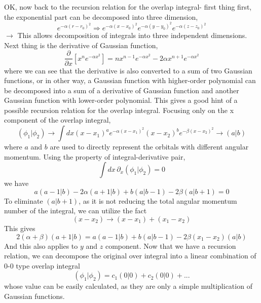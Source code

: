 \documentclass[12pt,a4paper,openany,twoside]{article}
\numberwithin{equation}{section}
\begin{document}
OK, now back to the recursion relation for the overlap integral- first thing first, the exponential part can be decomposed into three dimension,
\begin{equation}
    e^{-\alpha (r - r_0)^2} \Rightarrow e^{-\alpha (x-x_0)^2} e^{-\alpha (y-y_0)^2} e^{-\alpha (z-z_0)^2}
\end{equation}
$\rightarrow$ This allows decomposition of integrals into three independent dimensions. Next thing is the derivative of Gaussian function,
\begin{equation}
    \frac{\partial}{\partial x} [x^n e^{-\alpha x^2}] = n x^{n-1} e^{-\alpha x^2}- 2\alpha x^{n+1} e^{-\alpha x^2}
\end{equation}
where we can see that the derivative is also converted to a sum of two Gaussian functions, or in other way, a Gaussian function with higher-order polynomial can be decomposed into a sum of a derivative of Gaussian function and another Gaussian function with lower-order polynomial. This gives a good hint of a possible recursion relation for the overlap integral. Focusing only on the x component of the overlap integral,
\begin{equation}
    ( \phi_1 | \phi_2 ) \rightarrow \int dx (x-x_1)^a e^{-\alpha (x-x_1)^2} (x-x_2)^b e^{-\beta (x-x_2)^2} \rightarrow ( a | b )
\end{equation}
where $a$ and $b$ are used to directly represent the orbitals with different angular momentum. Using the property of integral-derivative pair,
    \begin{equation}
        \int dx \, \partial_x ( \phi_1 | \phi_2 ) = 0
    \end{equation}
    we have
    \begin{equation}
        a ( a-1 | b ) - 2 \alpha ( a + 1 | b ) + b (a | b - 1 ) - 2 \beta ( a | b +1 ) = 0
    \end{equation}
    To eliminate $( a | b + 1 )$, as it is not reducing the total angular momentum number of the integral, we can utilize the fact
\begin{equation}
    (x - x_2) \rightarrow (x-x_1) + (x_1 - x_2)
\end{equation}
This gives
\begin{equation}
    2 (\alpha + \beta ) ( a + 1 | b ) = a ( a-1 | b ) + b ( a | b - 1 ) - 2\beta(x_1 - x_2) ( a | b )
\end{equation}
And this also applies to $y$ and $z$ component. Now that we have a recursion relation, we can decompose the original over integral into a linear combination of 0-0 type overlap integral
\begin{equation}
    ( \phi_1 | \phi_2 ) = c_1 ( 0 | 0 ) + c_2 ( 0 | 0 ) + ...
\end{equation}
whose value can be easily calculated, as they are only a simple multiplication of Gaussian functions.
\end{document}
